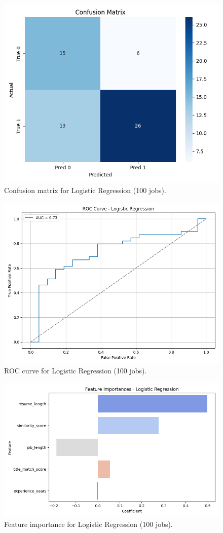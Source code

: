 \documentclass[a4paper]{article}
\begin{document}
\begin{multicols}{2}
\begin{figure}[H]
\centering
\includegraphics[width=0.45\linewidth]{Images/conf_matrix_logreg_100.png}
\caption{Confusion matrix for Logistic Regression (100 jobs).}
\end{figure}

\begin{figure}[H]
\centering
\includegraphics[width=0.65\linewidth]{Images/roc_logreg_100.png}
\caption{ROC curve for Logistic Regression (100 jobs).}
\end{figure}

\begin{figure}[H]
\centering
\includegraphics[width=0.75\linewidth]{Images/featimp_logreg_100.png}
\caption{Feature importance for Logistic Regression (100 jobs).}
\end{figure}


\end{multicols}
\end{document}

